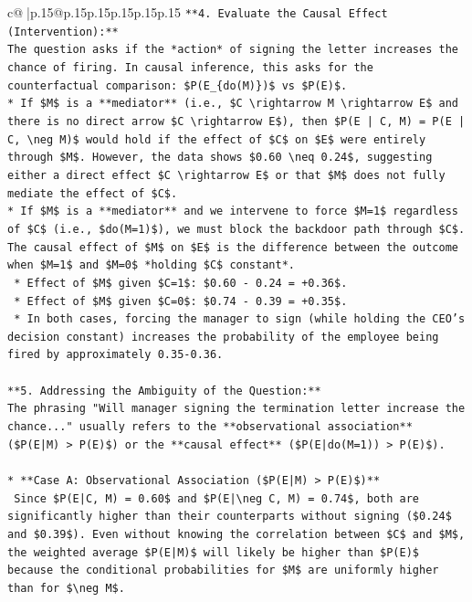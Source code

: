 \documentclass{article}
\begin{document}
{\begin{supertabular}{c@{$\;$}|p{.15\linewidth}@{}p{.15\linewidth}p{.15\linewidth}p{.15\linewidth}p{.15\linewidth}p{.15\linewidth}}
{{{\texttt{**4. Evaluate the Causal Effect (Intervention):**} \\
\texttt{The question asks if the *action* of signing the letter increases the chance of firing. In causal inference, this asks for the counterfactual comparison: \$P(E\_\{do(M)\})\$ vs \$P(E)\$.} \\
\texttt{*   If \$M\$ is a **mediator** (i.e., \$C \textbackslash{}rightarrow M \textbackslash{}rightarrow E\$ and there is no direct arrow \$C \textbackslash{}rightarrow E\$), then \$P(E | C, M) = P(E | C, \textbackslash{}neg M)\$ would hold if the effect of \$C\$ on \$E\$ were entirely through \$M\$. However, the data shows \$0.60 \textbackslash{}neq 0.24\$, suggesting either a direct effect \$C \textbackslash{}rightarrow E\$ or that \$M\$ does not fully mediate the effect of \$C\$.} \\
\texttt{*   If \$M\$ is a **mediator** and we intervene to force \$M=1\$ regardless of \$C\$ (i.e., \$do(M=1)\$), we must block the backdoor path through \$C\$. The causal effect of \$M\$ on \$E\$ is the difference between the outcome when \$M=1\$ and \$M=0\$ *holding \$C\$ constant*.} \\
\texttt{    *   Effect of \$M\$ given \$C=1\$: \$0.60 {-} 0.24 = +0.36\$.} \\
\texttt{    *   Effect of \$M\$ given \$C=0\$: \$0.74 {-} 0.39 = +0.35\$.} \\
\texttt{    *   In both cases, forcing the manager to sign (while holding the CEO's decision constant) increases the probability of the employee being fired by approximately 0.35{-}0.36.} \\
\\ 
\texttt{**5. Addressing the Ambiguity of the Question:**} \\
\texttt{The phrasing "Will manager signing the termination letter increase the chance..." usually refers to the **observational association** (\$P(E|M) > P(E)\$) or the **causal effect** (\$P(E|do(M=1)) > P(E)\$).} \\
\\ 
\texttt{*   **Case A: Observational Association (\$P(E|M) > P(E)\$)**} \\
\texttt{    Since \$P(E|C, M) = 0.60\$ and \$P(E|\textbackslash{}neg C, M) = 0.74\$, both are significantly higher than their counterparts without signing (\$0.24\$ and \$0.39\$). Even without knowing the correlation between \$C\$ and \$M\$, the weighted average \$P(E|M)\$ will likely be higher than \$P(E)\$ because the conditional probabilities for \$M\$ are uniformly higher than for \$\textbackslash{}neg M\$.} \\
}}}
\end{supertabular}}
\end{document}
